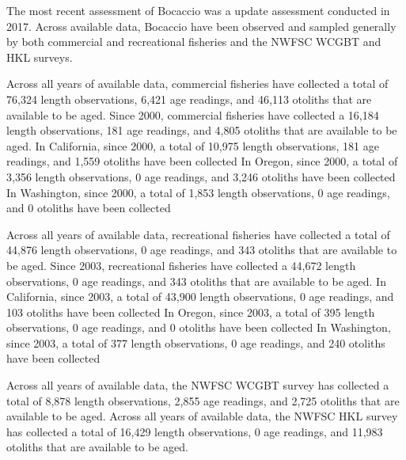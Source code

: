 \documentclass[11pt,
  english,
  letterpaper,
]{article}
\begin{document}
\leavevmode\tagmcend\tagstructend


The most recent assessment of Bocaccio was a update assessment conducted in 2017. Across available data, Bocaccio have been observed and sampled generally by both commercial and recreational fisheries and the NWFSC WCGBT and HKL surveys.

\leavevmode\tagmcend\tagstructend\par


Across all years of available data, commercial fisheries have collected a total of 76,324 length observations, 6,421 age readings, and 46,113 otoliths that are available to be aged. Since 2000, commercial fisheries have collected a 16,184 length observations, 181 age readings, and 4,805 otoliths that are available to be aged. In California, since 2000, a total of 10,975 length observations, 181 age readings, and 1,559 otoliths have been collected In Oregon, since 2000, a total of 3,356 length observations, 0 age readings, and 3,246 otoliths have been collected In Washington, since 2000, a total of 1,853 length observations, 0 age readings, and 0 otoliths have been collected

\leavevmode\tagmcend\tagstructend\par


Across all years of available data, recreational fisheries have collected a total of 44,876 length observations, 0 age readings, and 343 otoliths that are available to be aged. Since 2003, recreational fisheries have collected a 44,672 length observations, 0 age readings, and 343 otoliths that are available to be aged. In California, since 2003, a total of 43,900 length observations, 0 age readings, and 103 otoliths have been collected In Oregon, since 2003, a total of 395 length observations, 0 age readings, and 0 otoliths have been collected In Washington, since 2003, a total of 377 length observations, 0 age readings, and 240 otoliths have been collected

\leavevmode\tagmcend\tagstructend\par


Across all years of available data, the NWFSC WCGBT survey has collected a total of 8,878 length observations, 2,855 age readings, and 2,725 otoliths that are available to be aged. Across all years of available data, the NWFSC HKL survey has collected a total of 16,429 length observations, 0 age readings, and 11,983 otoliths that are available to be aged.
\end{document}
